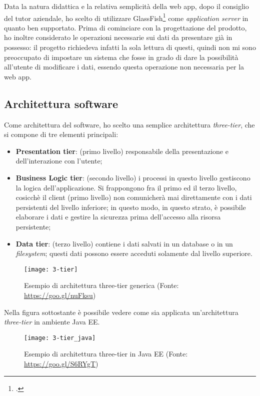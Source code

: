 Data la natura didattica e la relativa semplicità della \gls{web app}, dopo il consiglio del tutor aziendale, ho scelto di utilizzare GlassFish\footcite{site:glassfish} come \textit{application server} in quanto ben supportato.
Prima di cominciare con la progettazione del prodotto, ho inoltre considerato le operazioni necessarie sui dati da presentare già in possesso: il progetto richiedeva infatti la sola lettura di questi, quindi non mi sono preoccupato di impostare un sistema che fosse in grado di dare la possibilità all'utente di modificare i dati, essendo questa operazione non necessaria per la \gls{web app}.

\subsection{Architettura software}
Come architettura del software, ho scelto una semplice architettura \textit{three-tier}, che si compone di tre elementi principali:
\begin{itemize}
	\item \textbf{Presentation tier}: (primo livello) responsabile della presentazione e dell'interazione con l'utente; 
	\item \textbf{Business Logic tier}: (secondo livello) i processi in questo livello gestiscono la logica dell'applicazione. Si frappongono fra il primo ed il terzo livello, cosicchè il client (primo livello) non comunicherà mai direttamente con i dati persistenti del livello inferiore; in questo modo, in questo strato, è possibile elaborare i dati e gestire la sicurezza prima dell'accesso alla risorsa persistente;
	\item \textbf{Data tier}: (terzo livello) contiene i dati salvati in un database o in un \textit{filesystem}; questi dati possono essere acceduti solamente dal livello superiore.
\end{itemize}

\begin{figure}[!h]
	\centering
	\texttt{[image: 3-tier]}
	\caption{Esempio di architettura three-tier generica (Fonte: \href{https://goo.gl/nuFksu}{https://goo.gl/nuFksu})}
\end{figure}

Nella figura sottostante è possibile vedere come sia applicata un'architettura \textit{three-tier} in ambiente Java EE.
\begin{figure}[!h]
	\centering
	\texttt{[image: 3-tier\_java]}
	\caption{Esempio di architettura three-tier in Java EE (Fonte: \href{https://goo.gl/S6RYgT}{https://goo.gl/S6RYgT})}
\end{figure}

